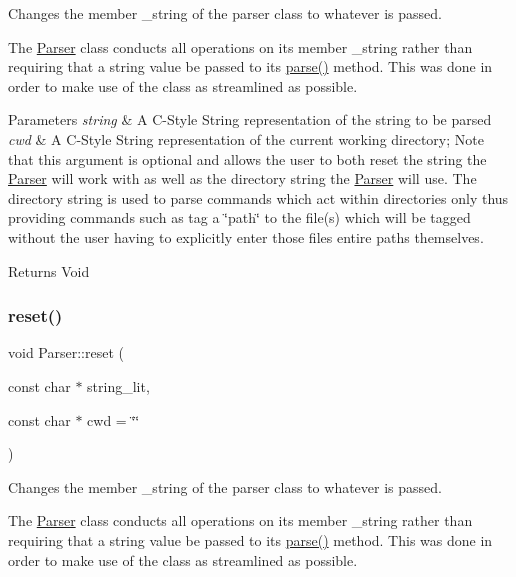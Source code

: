 Changes the member \+\_\+string of the parser class to whatever is passed. 

The \mbox{\hyperlink{classParser}{Parser}} class conducts all operations on its member \+\_\+string rather than requiring that a string value be passed to its \mbox{\hyperlink{classParser_a5b531e9ed867eeb8ccb9cb088cf35c24}{parse()}} method. This was done in order to make use of the class as streamlined as possible.


\begin{DoxyParams}{Parameters}
{\em string} & A C-\/\+Style String representation of the string to be parsed\\
\hline
{\em cwd} & A C-\/\+Style String representation of the current working directory; Note that this argument is optional and allows the user to both reset the string the \mbox{\hyperlink{classParser}{Parser}} will work with as well as the directory string the \mbox{\hyperlink{classParser}{Parser}} will use. The directory string is used to parse commands which act within directories only thus providing commands such as \textquotesingle{}tag\textquotesingle{} a \char`\"{}path\char`\"{} to the file(s) which will be tagged without the user having to explicitly enter those file\textquotesingle{}s entire paths themselves.\\
\hline
\end{DoxyParams}
\begin{DoxyReturn}{Returns}
Void 
\end{DoxyReturn}
\mbox{\label{classParser_ab51b81b1617f1948205d73804e3c0fb9}} 
\subsubsection{\texorpdfstring{reset()}{reset()}\hspace{0.1cm}{\footnotesize\ttfamily [3/3]}}
{\footnotesize\ttfamily void Parser\+::reset (\begin{DoxyParamCaption}\item[{const char $\ast$}]{string\+\_\+lit,  }\item[{const char $\ast$}]{cwd = {\ttfamily \char`\"{}\char`\"{}} }\end{DoxyParamCaption})}



Changes the member \+\_\+string of the parser class to whatever is passed. 

The \mbox{\hyperlink{classParser}{Parser}} class conducts all operations on its member \+\_\+string rather than requiring that a string value be passed to its \mbox{\hyperlink{classParser_a5b531e9ed867eeb8ccb9cb088cf35c24}{parse()}} method. This was done in order to make use of the class as streamlined as possible.


